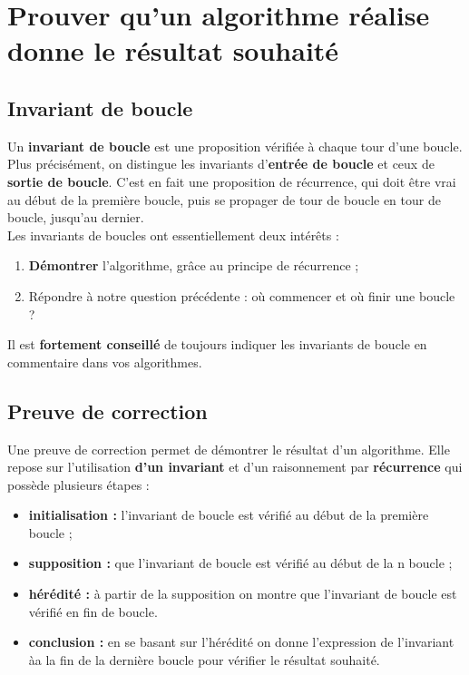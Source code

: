 \section{Prouver qu'un algorithme réalise donne le résultat souhaité}

\subsection{Invariant de boucle}

\begin{defi}
Un \textbf{invariant de boucle} est une proposition vérifiée à chaque tour d'une boucle. Plus 
précisément, on distingue les invariants d'\textbf{entrée de boucle} et ceux de \textbf{sortie de 
boucle}. C'est en fait une proposition de récurrence, qui doit être vrai au début de la première 
boucle, puis se propager de tour de boucle en tour de boucle, jusqu'au dernier.\\
Les invariants de boucles ont essentiellement deux intérêts :
\begin{enumerate}
 \item \textbf{Démontrer} l'algorithme, grâce au principe de récurrence ;
 \item Répondre à notre question précédente : où commencer et où finir une boucle ?
\end{enumerate}
\end{defi}

\begin{rem}
Il est \textbf{fortement conseillé} de toujours indiquer les invariants de boucle en commentaire 
dans vos algorithmes.\\ 
\end{rem}



\subsection{Preuve de correction}

\begin{defi}
Une preuve de correction permet de démontrer le résultat d'un algorithme. Elle repose sur l'utilisation \textbf{d'un invariant} et d'un raisonnement par \textbf{récurrence} qui possède plusieurs étapes : 
\begin{itemize}
\item \textbf{initialisation : } l'invariant de boucle est vérifié au début de la première boucle ;
\item \textbf{supposition : } que l'invariant de boucle est vérifié au début de la n boucle ;
\item \textbf{hérédité : } à partir de la supposition on montre que l'invariant de boucle est vérifié en fin de boucle.
\item \textbf{conclusion : } en se basant sur l'hérédité on donne l'expression de l'invariant àa la fin de la dernière boucle pour vérifier le résultat souhaité.
\end{itemize}
\end{defi}

